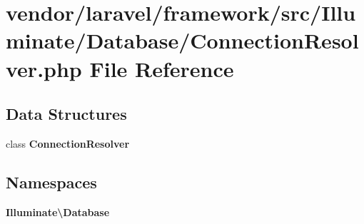 \section{vendor/laravel/framework/src/\+Illuminate/\+Database/\+Connection\+Resolver.php File Reference}
\label{_connection_resolver_8php}
\subsection*{Data Structures}
\begin{DoxyCompactItemize}
\item 
class {\bf Connection\+Resolver}
\end{DoxyCompactItemize}
\subsection*{Namespaces}
\begin{DoxyCompactItemize}
\item 
 {\bf Illuminate\textbackslash{}\+Database}
\end{DoxyCompactItemize}
